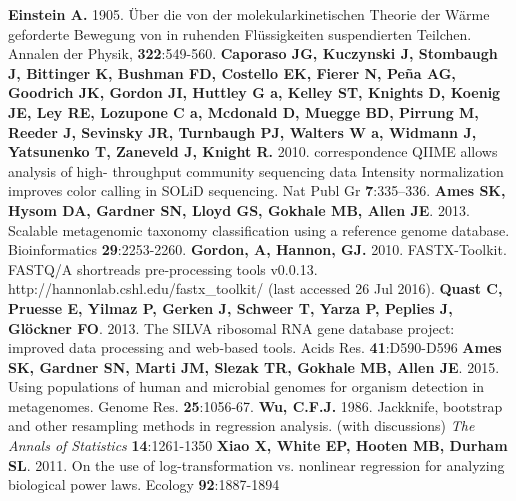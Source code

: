 \documentclass[12pt,oneside,letterpaper]{article}
\begin{document}
\begin{thebibliography}{99}
 {\bf Einstein A.} 1905. Über die von der molekularkinetischen Theorie der Wärme geforderte Bewegung von in ruhenden Flüssigkeiten suspendierten Teilchen. Annalen der Physik, {\bf 322}:549-560.
 {\bf Caporaso JG, Kuczynski J, Stombaugh J, Bittinger K, Bushman FD, Costello EK, Fierer N, Peña AG, Goodrich JK, Gordon JI, Huttley G a, Kelley ST, Knights D, Koenig JE, Ley RE, Lozupone C a, Mcdonald D, Muegge BD, Pirrung M, Reeder J, Sevinsky JR, Turnbaugh PJ, Walters W a, Widmann J, Yatsunenko T, Zaneveld J, Knight R.} 2010. correspondence QIIME allows analysis of high- throughput community sequencing data Intensity normalization improves color calling in SOLiD sequencing. Nat Publ Gr {\bf 7}:335–336.
 {\bf Ames SK, Hysom DA, Gardner SN, Lloyd GS, Gokhale MB, Allen JE}.  2013. Scalable metagenomic taxonomy classification using a reference genome database.  Bioinformatics {\bf 29}:2253-2260.
 {\bf Gordon, A, Hannon, GJ.} 2010. FASTX-Toolkit. FASTQ/A shortreads pre-processing tools v0.0.13. http://hannonlab.cshl.edu/fastx\_toolkit/ (last accessed 26 Jul 2016).
 {\bf Quast C, Pruesse E, Yilmaz P, Gerken J, Schweer T, Yarza P, Peplies J, Glöckner FO}. 2013. The SILVA ribosomal RNA gene database project: improved data processing and web-based tools. Acids Res. {\bf 41}:D590-D596
 {\bf Ames SK, Gardner SN, Marti JM, Slezak TR, Gokhale MB, Allen JE}. 2015. Using populations of human and microbial genomes for organism detection in metagenomes. Genome Res. {\bf 25}:1056-67.
 {\bf Wu, C.F.J.} 1986. Jackknife, bootstrap and other resampling methods in regression analysis. (with discussions) \textit{The Annals of Statistics} {\bf 14}:1261-1350 
 {\bf Xiao X, White EP, Hooten MB, Durham SL}. 2011. On the use of log-transformation vs. nonlinear regression for analyzing biological power laws. Ecology {\bf 92}:1887-1894
\end{thebibliography}

\end{document}

